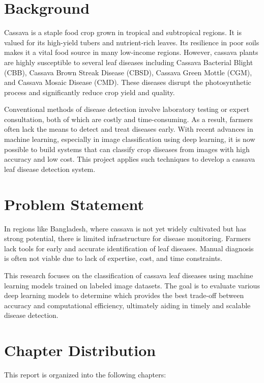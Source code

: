 \section{Background}
Cassava is a staple food crop grown in tropical and subtropical regions. It is valued for its high-yield tubers and nutrient-rich leaves. Its resilience in poor soils makes it a vital food source in many low-income regions. However, cassava plants are highly susceptible to several leaf diseases including Cassava Bacterial Blight (CBB), Cassava Brown Streak Disease (CBSD), Cassava Green Mottle (CGM), and Cassava Mosaic Disease (CMD). These diseases disrupt the photosynthetic process and significantly reduce crop yield and quality.

Conventional methods of disease detection involve laboratory testing or expert consultation, both of which are costly and time-consuming. As a result, farmers often lack the means to detect and treat diseases early. With recent advances in machine learning, especially in image classification using deep learning, it is now possible to build systems that can classify crop diseases from images with high accuracy and low cost. This project applies such techniques to develop a cassava leaf disease detection system.

\section{Problem Statement}
In regions like Bangladesh, where cassava is not yet widely cultivated but has strong potential, there is limited infrastructure for disease monitoring. Farmers lack tools for early and accurate identification of leaf diseases. Manual diagnosis is often not viable due to lack of expertise, cost, and time constraints.

This research focuses on the classification of cassava leaf diseases using machine learning models trained on labeled image datasets. The goal is to evaluate various deep learning models to determine which provides the best trade-off between accuracy and computational efficiency, ultimately aiding in timely and scalable disease detection.

\section{Chapter Distribution}
This report is organized into the following chapters:

